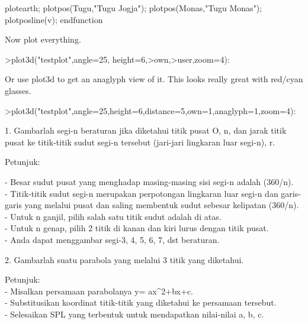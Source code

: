 \documentclass[a4paper,10pt]{article}
\begin{document}
\begin{eulernotebook}
\begin{eulercomment}
\begin{eulercomment}
\begin{eulercomment}
\begin{eulercomment}
\begin{eulercomment}
\begin{eulercomment}
\begin{eulerudf}
  plotearth;
  plotpos(Tugu,"Tugu Jogja"); plotpos(Monas,"Tugu Monas");
  plotposline(v);
  endfunction
\end{eulerudf}
\begin{eulercomment}
Now plot everything.
\end{eulercomment}
\begin{eulerprompt}
>plot3d("testplot",angle=25, height=6,>own,>user,zoom=4):
\end{eulerprompt}
\begin{eulercomment}
Or use plot3d to get an anaglyph view of it. This looks really great
with red/cyan glasses.
\end{eulercomment}
\begin{eulerprompt}
>plot3d("testplot",angle=25,height=6,distance=5,own=1,anaglyph=1,zoom=4):
\end{eulerprompt}
\begin{eulercomment}
1. Gambarlah segi-n beraturan jika diketahui titik pusat O, n, dan
jarak titik pusat ke titik-titik sudut segi-n tersebut (jari-jari
lingkaran luar segi-n), r.

Petunjuk:

- Besar sudut pusat yang menghadap masing-masing sisi segi-n adalah
(360/n).\\
- Titik-titik sudut segi-n merupakan perpotongan lingkaran luar segi-n
dan garis-garis yang melalui pusat dan saling membentuk sudut sebesar
kelipatan (360/n).\\
- Untuk n ganjil, pilih salah satu titik sudut adalah di atas.\\
- Untuk n genap, pilih 2 titik di kanan dan kiri lurus dengan titik
pusat.\\
- Anda dapat menggambar segi-3, 4, 5, 6, 7, dst beraturan.

2. Gambarlah suatu parabola yang melalui 3 titik yang diketahui.

Petunjuk:\\
- Misalkan persamaan parabolanya y= ax\textasciicircum{}2+bx+c.\\
- Substitusikan koordinat titik-titik yang diketahui ke persamaan
tersebut.\\
- Selesaikan SPL yang terbentuk untuk mendapatkan nilai-nilai a, b, c.


\end{eulercomment}
\end{eulercomment}
\end{eulercomment}
\end{eulercomment}
\end{eulercomment}
\end{eulercomment}
\end{eulercomment}
\end{eulernotebook}
\end{document}
